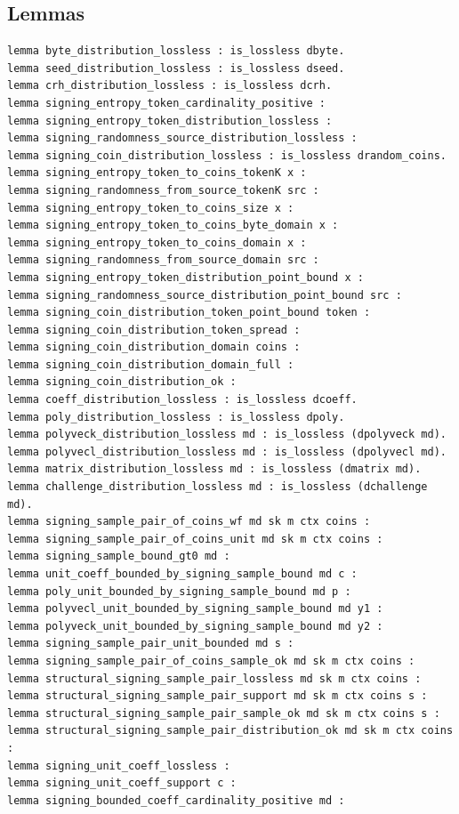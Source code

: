 \subsection*{Lemmas}
\begin{lstlisting}[language=EasyCrypt,basicstyle=\ttfamily\tiny]
lemma byte_distribution_lossless : is_lossless dbyte.
lemma seed_distribution_lossless : is_lossless dseed.
lemma crh_distribution_lossless : is_lossless dcrh.
lemma signing_entropy_token_cardinality_positive :
lemma signing_entropy_token_distribution_lossless :
lemma signing_randomness_source_distribution_lossless :
lemma signing_coin_distribution_lossless : is_lossless drandom_coins.
lemma signing_entropy_token_to_coins_tokenK x :
lemma signing_randomness_from_source_tokenK src :
lemma signing_entropy_token_to_coins_size x :
lemma signing_entropy_token_to_coins_byte_domain x :
lemma signing_entropy_token_to_coins_domain x :
lemma signing_randomness_from_source_domain src :
lemma signing_entropy_token_distribution_point_bound x :
lemma signing_randomness_source_distribution_point_bound src :
lemma signing_coin_distribution_token_point_bound token :
lemma signing_coin_distribution_token_spread :
lemma signing_coin_distribution_domain coins :
lemma signing_coin_distribution_domain_full :
lemma signing_coin_distribution_ok :
lemma coeff_distribution_lossless : is_lossless dcoeff.
lemma poly_distribution_lossless : is_lossless dpoly.
lemma polyveck_distribution_lossless md : is_lossless (dpolyveck md).
lemma polyvecl_distribution_lossless md : is_lossless (dpolyvecl md).
lemma matrix_distribution_lossless md : is_lossless (dmatrix md).
lemma challenge_distribution_lossless md : is_lossless (dchallenge md).
lemma signing_sample_pair_of_coins_wf md sk m ctx coins :
lemma signing_sample_pair_of_coins_unit md sk m ctx coins :
lemma signing_sample_bound_gt0 md :
lemma unit_coeff_bounded_by_signing_sample_bound md c :
lemma poly_unit_bounded_by_signing_sample_bound md p :
lemma polyvecl_unit_bounded_by_signing_sample_bound md y1 :
lemma polyveck_unit_bounded_by_signing_sample_bound md y2 :
lemma signing_sample_pair_unit_bounded md s :
lemma signing_sample_pair_of_coins_sample_ok md sk m ctx coins :
lemma structural_signing_sample_pair_lossless md sk m ctx coins :
lemma structural_signing_sample_pair_support md sk m ctx coins s :
lemma structural_signing_sample_pair_sample_ok md sk m ctx coins s :
lemma structural_signing_sample_pair_distribution_ok md sk m ctx coins :
lemma signing_unit_coeff_lossless :
lemma signing_unit_coeff_support c :
lemma signing_bounded_coeff_cardinality_positive md :

\end{lstlisting}
